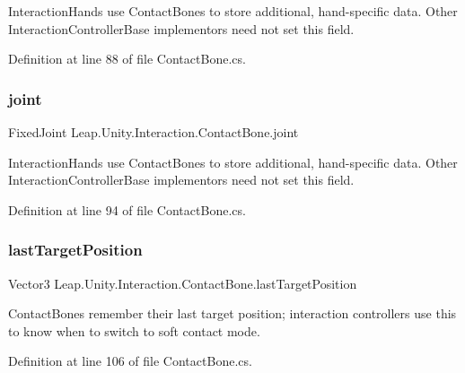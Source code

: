 Interaction\+Hands use Contact\+Bones to store additional, hand-\/specific data. Other Interaction\+Controller\+Base implementors need not set this field. 



Definition at line 88 of file Contact\+Bone.\+cs.

\mbox{\label{class_leap_1_1_unity_1_1_interaction_1_1_contact_bone_a0e26687a959891f032733c206c91dd57}} 
\subsubsection{\texorpdfstring{joint}{joint}}
{\footnotesize\ttfamily Fixed\+Joint Leap.\+Unity.\+Interaction.\+Contact\+Bone.\+joint}



Interaction\+Hands use Contact\+Bones to store additional, hand-\/specific data. Other Interaction\+Controller\+Base implementors need not set this field. 



Definition at line 94 of file Contact\+Bone.\+cs.

\mbox{\label{class_leap_1_1_unity_1_1_interaction_1_1_contact_bone_a89bc51c6c1204371ec97fdb6d2d3d8e8}} 
\subsubsection{\texorpdfstring{lastTargetPosition}{lastTargetPosition}}
{\footnotesize\ttfamily Vector3 Leap.\+Unity.\+Interaction.\+Contact\+Bone.\+last\+Target\+Position}



Contact\+Bones remember their last target position; interaction controllers use this to know when to switch to soft contact mode. 



Definition at line 106 of file Contact\+Bone.\+cs.

\mbox{\label{class_leap_1_1_unity_1_1_interaction_1_1_contact_bone_a609880a3d01dd5e23b6b03b546cc2ba4}} 
